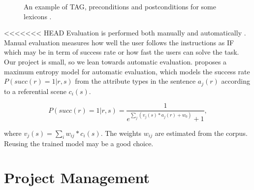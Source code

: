 \documentclass[11pt]{article} %
\begin{document}
\begin{figure}[hbt!]
\centering
{}
\qquad
{}
\caption{An example of TAG, preconditions and postconditions for some lexicons \cite{garoufi2014generation}. \label{overflow}}
\label{fig:exampleTAG}
\end{figure}

<<<<<<< HEAD
Evaluation is performed both manually and automatically \cite{garoufi2014generation}.
Manual evaluation measures how well the user follows the instructions
as IF which may be in term of success rate or how fast the users can solve the task.
Our project is small, so we lean towards automatic evaluation.
\cite{garoufi2014generation} proposes a maximum entropy model for automatic evaluation,
which models the success rate $P(succ(r) = 1|r,s)$ from the attribute
types in the sentence $a_j(r)$ according to a referential scene $c_i(s)$. 

\begin{equation} \label{auto_eqn}
P(succ(r) = 1| r, s) =\frac{1}{e^{\sum_j (v_j(s)*a_j(r) + w_0)} + 1} ,
\end{equation}

where $v_j(s) = \sum_i w_{ij} * c_i(s)$.
The weights $w_{ij}$ are estimated from the corpus.
Reusing the trained model may be a good choice.

\section{Project Management}
\end{document}
